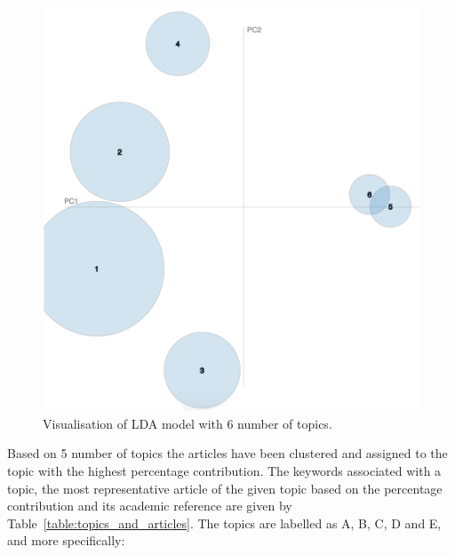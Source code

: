 \documentclass{article}
\theoremstyle{definition}
\begin{document}
\begin{figure}[!hbtp]
    \centering
    \includegraphics[width=.43\textwidth]{./assets/images/topic_clustering.png}
    \caption{Visualisation of LDA model with 6 number of topics.}
    \label{fig:lda_visualisation}
\end{figure}

Based on 5 number of topics the articles have been clustered and assigned
to the topic with the highest percentage contribution. The keywords associated
with a topic, the most representative article of the given topic based on the percentage
contribution and its academic reference are given by
Table~\ref{table:topics_and_articles}. The topics are labelled as A, B, C, D and
E, and more specifically:
\end{document}
